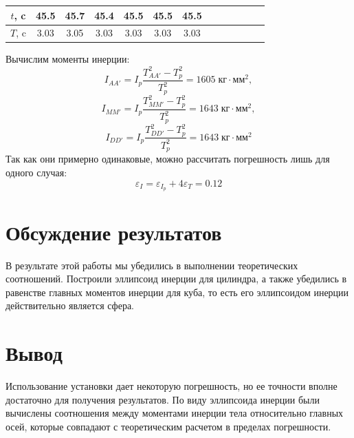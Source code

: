 \documentclass[a4paper, 12pt]{article}
\begin{document}
\begin{enumerate}
\begin{table}[H]
\begin{tabular}{|ccccccccccccc|}
			\multicolumn{1}{|c|}{$t$, c}  & \multicolumn{1}{c|}{45.5} & \multicolumn{1}{c|}{45.7} & \multicolumn{1}{c|}{45.4} & \multicolumn{1}{c|}{45.5} & \multicolumn{1}{c|}{45.5} & \multicolumn{1}{c|}{45.5}    & \multicolumn{1}{c|}{}     & \multicolumn{1}{c|}{}     & \multicolumn{1}{c|}{}     & \multicolumn{1}{c|}{}     & \multicolumn{1}{c|}{}               &              \\ \hline
			\multicolumn{1}{|c|}{$T$, c}  & \multicolumn{1}{c|}{3.03} & \multicolumn{1}{c|}{3.05} & \multicolumn{1}{c|}{3.03} & \multicolumn{1}{c|}{3.03} & \multicolumn{1}{c|}{3.03} & \multicolumn{1}{c|}{3.03}    & \multicolumn{1}{c|}{}     & \multicolumn{1}{c|}{}     & \multicolumn{1}{c|}{}     & \multicolumn{1}{c|}{}     & \multicolumn{1}{c|}{}               &              \\ \hline
			\end{tabular}
		\end{table}

		Вычислим моменты инерции:
		$$ I_{AA'} = I_p \frac{T_{AA'}^2 - T_p^2}{T_p^2} = 1605\; \text{кг} \cdot \text{мм} ^2, $$
		$$ I_{MM'} = I_p \frac{T_{MM'}^2 - T_p^2}{T_p^2} = 1643\; \text{кг} \cdot \text{мм} ^2, $$
		$$ I_{DD'} = I_p \frac{T_{DD'}^2 - T_p^2}{T_p^2} = 1643\; \text{кг} \cdot \text{мм} ^2  $$
		Так как они примерно одинаковые, можно рассчитать погрешность лишь для одного случая:
		$$ \varepsilon_I = \varepsilon_{I_p} + 4\varepsilon_{T} = 0.12 $$


	\end{enumerate}


	\section{Обсуждение результатов}
	В результате этой работы мы убедились в выполнении теоретических
	соотношений. Построили эллипсоид инерции для цилиндра, а также убедились в
	равенстве главных моментов инерции для куба, то есть его эллипсоидом инерции
	действительно является сфера.
	\section{Вывод}
	Использование установки дает некоторую погрешность, но ее
	точности вполне достаточно для получения результатов. По виду эллипсоида инерции были вычислены соотношения между моментами
	инерции тела относительно главных осей,
	которые совпадают с теоретическим расчетом в пределах погрешности.
\end{document}
